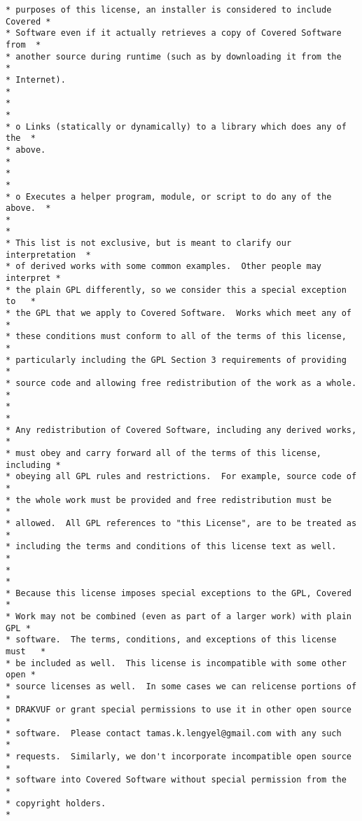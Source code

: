 \begin{lstlisting}[style=CStyle]
* purposes of this license, an installer is considered to include Covered *
* Software even if it actually retrieves a copy of Covered Software from  *
* another source during runtime (such as by downloading it from the       *
* Internet).                                                              *
*                                                                         *
* o Links (statically or dynamically) to a library which does any of the  *
* above.                                                                  *
*                                                                         *
* o Executes a helper program, module, or script to do any of the above.  *
*                                                                         *
* This list is not exclusive, but is meant to clarify our interpretation  *
* of derived works with some common examples.  Other people may interpret *
* the plain GPL differently, so we consider this a special exception to   *
* the GPL that we apply to Covered Software.  Works which meet any of     *
* these conditions must conform to all of the terms of this license,      *
* particularly including the GPL Section 3 requirements of providing      *
* source code and allowing free redistribution of the work as a whole.    *
*                                                                         *
* Any redistribution of Covered Software, including any derived works,    *
* must obey and carry forward all of the terms of this license, including *
* obeying all GPL rules and restrictions.  For example, source code of    *
* the whole work must be provided and free redistribution must be         *
* allowed.  All GPL references to "this License", are to be treated as    *
* including the terms and conditions of this license text as well.        *
*                                                                         *
* Because this license imposes special exceptions to the GPL, Covered     *
* Work may not be combined (even as part of a larger work) with plain GPL *
* software.  The terms, conditions, and exceptions of this license must   *
* be included as well.  This license is incompatible with some other open *
* source licenses as well.  In some cases we can relicense portions of    *
* DRAKVUF or grant special permissions to use it in other open source     *
* software.  Please contact tamas.k.lengyel@gmail.com with any such       *
* requests.  Similarly, we don't incorporate incompatible open source     *
* software into Covered Software without special permission from the      *
* copyright holders.                                                      *

\end{lstlisting}
